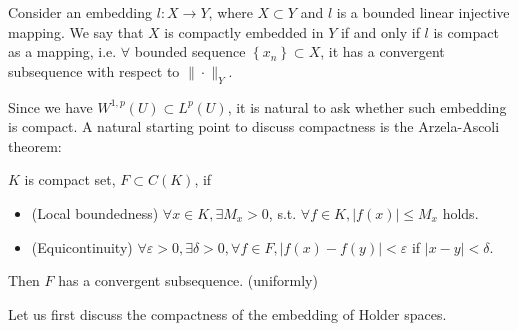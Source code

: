 \begin{definition}
\label{def: compact embedding}
Consider an embedding $l: X \rightarrow Y$, where $X \subset Y$ and $l$ is a bounded linear injective mapping. We say that $X$ is compactly embedded in $Y$ if and only if $l$ is compact as a mapping, i.e. $\forall$ bounded sequence $\left\{x_{n}\right\} \subset X$, it has a convergent subsequence with respect to $\|\cdot\|_{Y}$.
\end{definition}

Since we have $W^{1, p}(U) \subset L^{p}(U)$, it is natural to ask whether such embedding is compact. A natural starting point to discuss compactness is the Arzela-Ascoli theorem:

\begin{theorem}
\label{thm: Arzela-Ascoli}
$K$ is compact set, $F \subset C(K)$, if
\begin{itemize}
    \item (Local boundedness) $\forall x \in K, \exists M_{x}>0$, s.t. $\forall f \in K,|f(x)| \leq M_{x}$ holds.
    \item (Equicontinuity) $\forall \varepsilon>0, \exists \delta>0, \forall f \in F,|f(x)-f(y)|<\varepsilon$ if $|x-y|<\delta$.
\end{itemize}
Then $F$ has a convergent subsequence. (uniformly)
\end{theorem}

Let us first discuss the compactness of the embedding of Holder spaces.

